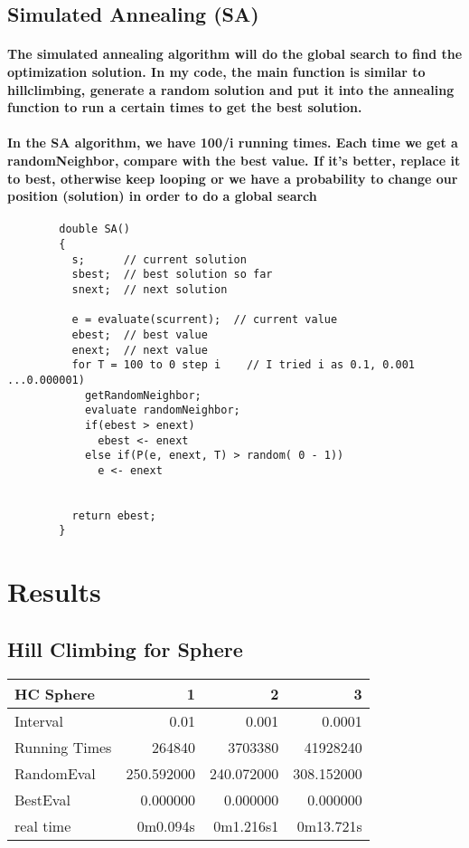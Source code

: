 \documentclass[12pt]{article}
\begin{document}
	
	\subsection{Simulated Annealing (SA)}
	\paragraph{The simulated annealing algorithm will do the global search to find the optimization solution. In my code, the main function is similar to hillclimbing, generate a random solution and put it into the annealing function to run a certain times to get the best solution.}
	\paragraph{In the SA algorithm, we have 100/i running times. Each time we get a randomNeighbor, compare with the best value. If it's better, replace it to best, otherwise keep looping or we have a probability to change our position (solution) in order to do a global search }
	\begin{verbatim}
		double SA()
		{
		  s;      // current solution
		  sbest;  // best solution so far
		  snext;  // next solution
		  
		  e = evaluate(scurrent);  // current value
		  ebest;  // best value
		  enext;  // next value
		  for T = 100 to 0 step i    // I tried i as 0.1, 0.001 ...0.000001)
		    getRandomNeighbor;
		    evaluate randomNeighbor;
		    if(ebest > enext)
		      ebest <- enext
		    else if(P(e, enext, T) > random( 0 - 1))
		      e <- enext
		    
		    
		  return ebest;
		}
	\end{verbatim}
	
\newpage
\section{Results}
	\subsection{Hill Climbing for Sphere}
	\begin{center}
	\begin{tabular}{| l | r | r | r | }
	\hline
	\bf HC Sphere & \bf 1 & \bf 2 & \bf 3 \\
	\hline
	Interval & 0.01 & 0.001 & 0.0001 \\
	Running Times & 264840 & 3703380 & 41928240 \\
	RandomEval & 250.592000 & 240.072000 & 308.152000  \\
	BestEval & 0.000000 & 0.000000 & 0.000000  \\
	real time & 0m0.094s &0m1.216s1 & 0m13.721s  \\
	\hline
	\end{tabular}
	\end{center}
	
\end{document}
